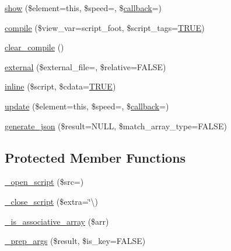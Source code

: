 \begin{DoxyCompactItemize}
\item 
\mbox{\hyperlink{class_c_i___javascript_a37f187e47112ada2d8ffe4c840556178}{show}} (\$element=\textquotesingle{}this\textquotesingle{}, \$speed=\textquotesingle{}\textquotesingle{}, \$\mbox{\hyperlink{_functions_8php_ae2242eb47799ca6a822b022dc1bd1ac9}{callback}}=\textquotesingle{}\textquotesingle{})
\item 
\mbox{\hyperlink{class_c_i___javascript_a16edc3063561b4940ebde2714b1b75f4}{compile}} (\$view\+\_\+var=\textquotesingle{}script\+\_\+foot\textquotesingle{}, \$script\+\_\+tags=\mbox{\hyperlink{constants_8php_ae04a3efe6aa42044f803ee90c2277846}{T\+R\+UE}})
\item 
\mbox{\hyperlink{class_c_i___javascript_a4e3a7e7ffc20e8f578a0d66f52def10d}{clear\+\_\+compile}} ()
\item 
\mbox{\hyperlink{class_c_i___javascript_a1b1cfdf25c7ceae03d2c60019bdf59b9}{external}} (\$external\+\_\+file=\textquotesingle{}\textquotesingle{}, \$relative=F\+A\+L\+SE)
\item 
\mbox{\hyperlink{class_c_i___javascript_aeecd5d85370a4037c00dba82960816e1}{inline}} (\$script, \$cdata=\mbox{\hyperlink{constants_8php_ae04a3efe6aa42044f803ee90c2277846}{T\+R\+UE}})
\item 
\mbox{\hyperlink{class_c_i___javascript_a97c369870fff724c8bbdae779a715446}{update}} (\$element=\textquotesingle{}this\textquotesingle{}, \$speed=\textquotesingle{}\textquotesingle{}, \$\mbox{\hyperlink{_functions_8php_ae2242eb47799ca6a822b022dc1bd1ac9}{callback}}=\textquotesingle{}\textquotesingle{})
\item 
\mbox{\hyperlink{class_c_i___javascript_ae60bb50a1e4cbbce1f6c29a73fad5e07}{generate\+\_\+json}} (\$result=N\+U\+LL, \$match\+\_\+array\+\_\+type=F\+A\+L\+SE)
\end{DoxyCompactItemize}
\subsection*{Protected Member Functions}
\begin{DoxyCompactItemize}
\item 
\mbox{\hyperlink{class_c_i___javascript_ab90b7bf672ff305aa302ced7c8255762}{\+\_\+open\+\_\+script}} (\$src=\textquotesingle{}\textquotesingle{})
\item 
\mbox{\hyperlink{class_c_i___javascript_a6646f735ee21ffe05997b5571f1be45c}{\+\_\+close\+\_\+script}} (\$extra=\char`\"{}\textbackslash{})
\item 
\mbox{\hyperlink{class_c_i___javascript_aa37c9b1b7e2898fe21a0deaace09b156}{\+\_\+is\+\_\+associative\+\_\+array}} (\$arr)
\item 
\mbox{\hyperlink{class_c_i___javascript_a10b9bc25e0d84b0dacb1bd7b09f3c0be}{\+\_\+prep\+\_\+args}} (\$result, \$is\+\_\+key=F\+A\+L\+SE)
\end{DoxyCompactItemize}
